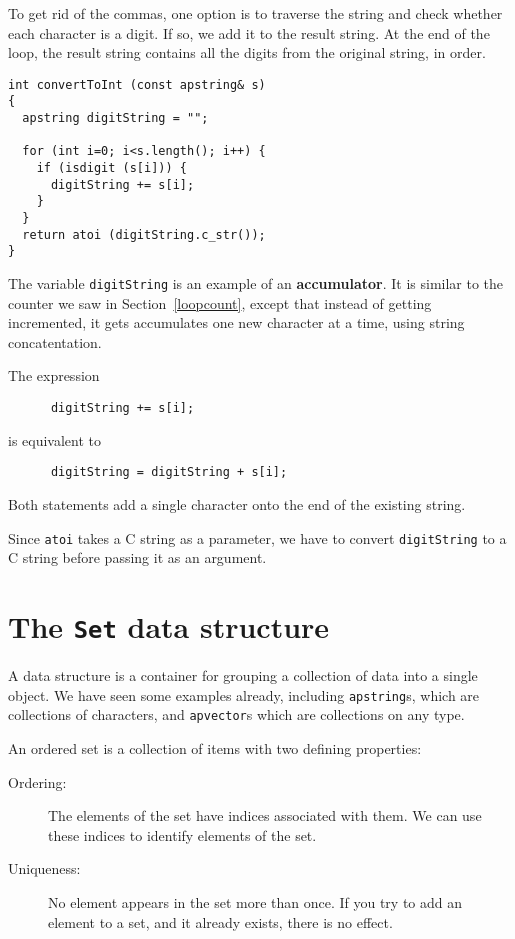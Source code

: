 
To get rid of the commas, one option is to traverse the string and
check whether each character is a digit.  If so, we add it to the
result string.  At the end of the loop, the result string contains all
the digits from the original string, in order.

\begin{verbatim}
int convertToInt (const apstring& s)
{
  apstring digitString = "";

  for (int i=0; i<s.length(); i++) {
    if (isdigit (s[i])) {
      digitString += s[i];
    }
  }
  return atoi (digitString.c_str());
}
\end{verbatim}
%
The variable {\tt digitString} is an example of an {\bf accumulator}.  It is
similar to the counter we saw in Section~\ref{loopcount},
except that instead of getting incremented, it gets accumulates
one new character at a time, using string concatentation.

The expression

\begin{verbatim}
      digitString += s[i];
\end{verbatim}
%
is equivalent to

\begin{verbatim}
      digitString = digitString + s[i];
\end{verbatim}
%
Both statements add a single character onto the end of the existing
string.


Since {\tt atoi} takes a C string as a parameter, we have
to convert {\tt digitString} to a C string before passing it
as an argument.

\section{The {\tt Set} data structure}

A data structure is a container for grouping a collection
of data into a single object.  We have seen some examples already,
including {\tt apstring}s, which are collections of characters,
and {\tt apvector}s which are collections on any type.

An ordered set is a collection of items with two defining
properties:

\begin{description}

\item[Ordering:] The elements of the set have indices associated
with them.  We can use these indices to identify elements of the set.

\item[Uniqueness:] No element appears in the set more than once.
If you try to add an element to a set, and it already exists, there
is no effect.

\end{description}

